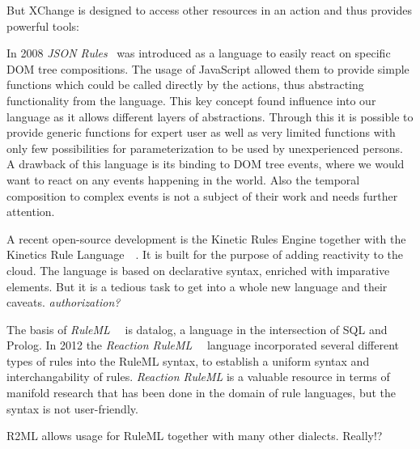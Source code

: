 But XChange is designed to access other resources in an action and thus provides powerful tools:

In 2008 \emph{JSON Rules}~\cite{2008-Giurca_Pascalau-JSON_Rules.pdf} was introduced as a language to easily react on specific DOM tree compositions.
The usage of JavaScript allowed them to provide simple functions which could be called directly by the actions, thus abstracting functionality from the language.
This key concept found influence into our language as it allows different layers of abstractions.
Through this it is possible to provide generic functions for expert user as well as very limited functions with only few possibilities for parameterization to be used by unexperienced persons.
A drawback of this language is its binding to DOM tree events, where we would want to react on any events happening in the world.
Also the temporal composition to complex events is not a subject of their work and needs further attention.


A recent open-source development is the Kinetic Rules Engine together with the Kinetics Rule Language~~\cite{bookTheLiveWeb}.
It is built for the purpose of adding reactivity to the cloud.
The language is based on declarative syntax, enriched with imparative elements.
But it is a tedious task to get into a whole new language and their caveats.
\emph{authorization?}

The basis of \emph{RuleML}~~\cite{2006-Boley-RuleML.pdf} is datalog, a language in the intersection of SQL and Prolog.
In 2012 the \emph{Reaction RuleML}~~\cite{2012-Paschke_etal-ReactionRuleML.pdf} language incorporated several different types of rules into the RuleML syntax, to establish a uniform syntax and interchangability of rules.
\emph{Reaction RuleML} is a valuable resource in terms of manifold research that has been done in the domain of rule languages, but the syntax is not user-friendly.


R2ML allows usage for RuleML together with many other dialects. Really!?



